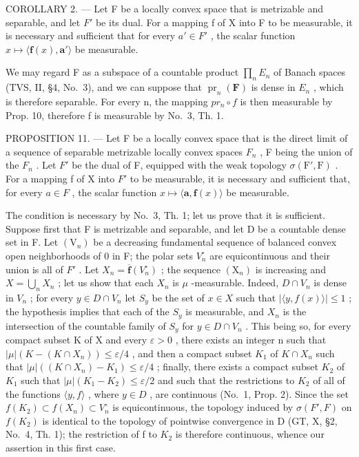 COROLLARY 2. --- Let F be a locally convex space that is metrizable and separable, and let \(F'\) be its dual. For a mapping f of X into F to be measurable, it is necessary and sufficient that for every \(a' \in F'\) , the scalar function \(x \mapsto \langle \mathbf{f}(x), \mathbf{a}' \rangle\) be measurable.

We may regard F as a subspace of a countable product \(\prod_{n}E_{n}\) of Banach spaces (TVS, II, §4, No.~3), and we can suppose that \(\operatorname{pr}_{n}(\mathbf{F})\) is dense in \(E_{n}\) , which is therefore separable. For every n, the mapping \(pr_{n}\circ f\) is then measurable by Prop. 10, therefore f is measurable by No.~3, Th. 1.

PROPOSITION 11. --- Let F be a locally convex space that is the direct limit of a sequence of separable metrizable locally convex spaces \(F_{n}\) , F being the union of the \(F_{n}\) . Let \(F'\) be the dual of F, equipped with the weak topology \(\sigma(\mathrm{F}',\mathrm{F})\) . For a mapping f of X into \(F'\) to be measurable, it is necessary and sufficient that, for every \(a \in F\) , the scalar function \(x \mapsto \langle \mathbf{a}, \mathbf{f}(x) \rangle\) be measurable.

The condition is necessary by No.~3, Th. 1; let us prove that it is sufficient. Suppose first that F is metrizable and separable, and let D be a countable dense set in F. Let \((\mathrm{V}_{n})\) be a decreasing fundamental sequence of balanced convex open neighborhoods of 0 in F; the polar sets \(V_{n}^{\circ}\) are equicontinuous and their union is all of \(F'\) . Let \(X_{n} = \overline{\mathbf{f}}(V_{n}^{\circ})\) ; the sequence \((\mathrm{X}_{n})\) is increasing and \(X = \bigcup_{n} X_{n}\) ; let us show that each \(X_{n}\) is \(\mu\) -measurable. Indeed, \(D \cap V_{n}\) is dense in \(V_{n}\) ; for every \(y \in D \cap V_{n}\) let \(S_{y}\) be the set of \(x \in X\) such that \(|\langle y, f(x) \rangle| \leqslant 1\) ; the hypothesis implies that each of the \(S_{y}\) is measurable, and \(X_{n}\) is the intersection of the countable family of \(S_{y}\) for \(y \in D \cap V_{n}\) . This being so, for every compact subset K of X and every \(\varepsilon > 0\) , there exists an integer n such that \(|\mu| (K - (K \cap X_{n})) \leqslant \varepsilon/4\) , and then a compact subset \(K_{1}\) of \(K \cap X_{n}\) such that \(|\mu| ((K \cap X_{n}) - K_{1}) \leqslant \varepsilon/4\) ; finally, there exists a compact subset \(K_{2}\) of \(K_{1}\) such that \(|\mu| (K_{1} - K_{2}) \leqslant \varepsilon/2\) and such that the restrictions to \(K_{2}\) of all of the functions \(\langle y, f \rangle\) , where \(y \in D\) , are continuous (No.~1, Prop. 2). Since the set \(f(K_{2}) \subset f(X_{n}) \subset V_{n}^{\circ}\) is equicontinuous, the topology induced by \(\sigma(F', F)\) on \(f(K_{2})\) is identical to the topology of pointwise convergence in D (GT, X, §2, No.~4, Th. 1); the restriction of f to \(K_{2}\) is therefore continuous, whence our assertion in this first case.

